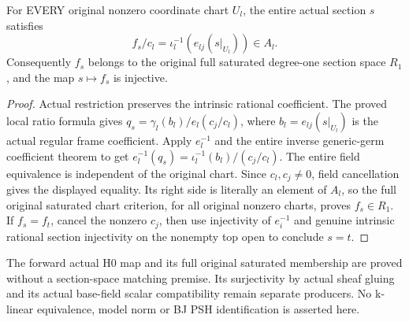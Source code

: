 \begin{theorem}
\label{thm:seven-native-original-global-section-saturation}
\leanok
For EVERY original nonzero coordinate chart $U_l$, the entire actual
section $s$ satisfies
\[
 f_s/c_l=\iota_l^{-1}(e_{lj}(s|_{U_l}))\in A_l.
\]
Consequently $f_s$ belongs to the original full saturated degree-one
section space $R_1$, and the map $s\mapsto f_s$ is injective.
\end{theorem}
\begin{proof}
Actual restriction preserves the intrinsic rational coefficient. The
proved local ratio formula gives
$q_s=\gamma_l(b_l)/e_l(c_j/c_l)$, where
$b_l=e_{lj}(s|_{U_l})$ is the actual regular frame coefficient. Apply
$e_l^{-1}$ and the entire inverse generic-germ coefficient theorem to get
$e_l^{-1}(q_s)=\iota_l^{-1}(b_l)/(c_j/c_l)$. The entire field equivalence is
independent of the original chart. Since $c_l,c_j\ne0$, field cancellation
gives the displayed equality. Its right side is literally an element of
$A_l$, so the full original saturated chart criterion, for all original
nonzero charts, proves $f_s\in R_1$. If $f_s=f_t$, cancel the nonzero
$c_j$, then use injectivity of $e_i^{-1}$ and genuine intrinsic rational
section injectivity on the nonempty top open to conclude $s=t$.
\end{proof}

\begin{remark}
The forward actual H0 map and its full original saturated membership are
proved without a section-space matching premise. Its surjectivity by
actual sheaf gluing and its actual base-field scalar compatibility remain
separate producers. No k-linear equivalence, model norm or BJ PSH
identification is asserted here.
\end{remark}

